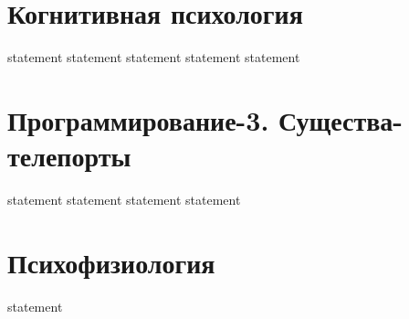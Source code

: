\section{Когнитивная психология}

{statement}
{statement}
{statement}
{statement}
{statement}

\section{Программирование-3. Существа-телепорты}

{statement}
{statement}
{statement}
{statement}

\section{Психофизиология}

{statement}